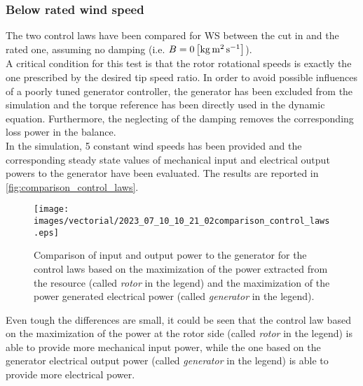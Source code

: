 \subsubsection{Below rated wind speed}
The two control laws have been compared for WS between the cut in and the rated one, assuming no damping (i.e. $B=0 \left[\si{\kilo\gram\square\meter\per\second}\right]$).\\
A critical condition for this test is that the rotor rotational speeds is exactly the one prescribed by the desired tip speed ratio. In order to avoid possible influences of a poorly tuned generator controller, the generator has been excluded from the simulation and the torque reference has been directly used in the dynamic equation. Furthermore, the neglecting of the damping removes the corresponding loss power in the balance. \\
In the simulation, 5 constant wind speeds has been provided and the corresponding steady state values of mechanical input and electrical output powers to the generator have been evaluated. The results are reported in \autoref{fig:comparison_control_laws}.
\begin{figure}[htb]
  \centering
  \texttt{[image: images/vectorial/2023\_07\_10\_10\_21\_02comparison\_control\_laws.eps]}
  \caption{Comparison of input and output power to the generator for the control laws based on the maximization of the power extracted from the resource (called \textit{rotor} in the legend) and the maximization of the power generated electrical power (called \textit{generator} in the legend).}
  \label{fig:comparison_control_laws}
\end{figure}

Even tough the differences are small, it could be seen that the control law based on the maximization of the power at the rotor side (called \textit{rotor} in the legend) is able to provide more mechanical input power, while the one based on the generator electrical output power (called \textit{generator} in the legend) is able to provide more electrical power.

